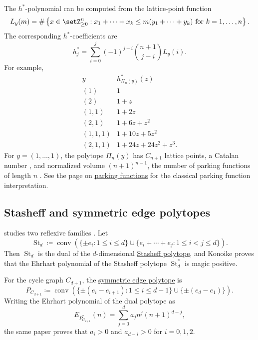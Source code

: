 \begin{example*}
The $h^*$-polynomial can be computed from the lattice-point function
\[
  L_y(m)
  =
  \#\left\{
    x\in\setZ_{\geq 0}^n :
    x_1+\dotsb+x_k
    \leq
    m(y_1+\dotsb+y_k)
    \text{ for } k=1,\dotsc,n
  \right\}.
\]
The corresponding $h^*$-coefficients are
\[
  h^*_j
  =
  \sum_{i=0}^j
  (-1)^{j-i}
  \binom{n+1}{j-i}
  L_y(i).
\]
For example,
\[
\begin{array}{c|c}
 y & h^*_{\Pi_n(y)}(z) \\ \hline
 (1) & 1 \\
 (2) & 1+z \\
 (1,1) & 1+2z \\
 (2,1) & 1+6z+z^2 \\
 (1,1,1) & 1+10z+5z^2 \\
 (2,1,1) & 1+24z+24z^2+z^3 .
\end{array}
\]
For $y=(1,\dotsc,1)$, the polytope $\Pi_n(y)$ has $C_{n+1}$ lattice points,
a Catalan number , and normalized volume $(n+1)^{n-1}$, the
number of parking functions of length $n$ .
See the page on \hyperref[parkingFunctions]{parking functions} for the
classical parking function interpretation.
\end{example*}

\subsection[reflexivePolytopeMagicPositivity]{Stasheff and symmetric edge polytopes}

\begin{example*}
 studies two reflexive families
\cite{Konoike2024x}.
Let
\[
 \operatorname{St}_d \coloneqq \operatorname{conv}\left(
 \{\pm e_i : 1\leq i \leq d\} \cup
 \{e_i+\dotsb+e_j : 1\leq i \lt j \leq d\}
 \right).
\]
Then $\operatorname{St}_d$ is the dual of the
$d$-dimensional \hyperref[stasheffPolytope]{Stasheff polytope},
and Konoike proves that the Ehrhart polynomial of the Stasheff polytope
$\operatorname{St}_d^*$ is magic positive.

For the cycle graph $C_{d+1}$, the
\hyperref[symmetricEdgePolytope]{symmetric edge polytope} is
\[
 P_{C_{d+1}} \coloneqq
 \operatorname{conv}\left(
 \{\pm(e_i-e_{i+1}) : 1\leq i \leq d-1\} \cup \{\pm(e_d-e_1)\}
 \right).
\]
Writing the Ehrhart polynomial of the dual polytope as
\[
 E_{P_{C_{d+1}}^*}(n) = \sum_{j=0}^d a_j n^j (n+1)^{d-j},
\]
the same paper proves that $a_i > 0$ and $a_{d-i} > 0$ for $i=0,1,2$.
\end{example*}





